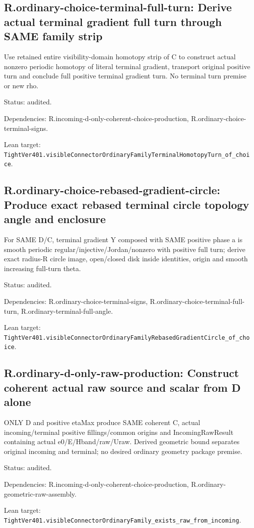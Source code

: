 \documentclass{article}
\begin{document}
\subsection*{R.ordinary-choice-terminal-full-turn: Derive actual terminal gradient full turn through SAME family strip}
Use retained entire visibility-domain homotopy strip of C to construct actual nonzero periodic homotopy of literal terminal gradient, transport original positive turn and conclude full positive terminal gradient turn. No terminal turn premise or new rho.
\par Status: audited.
\par Dependencies: R.incoming-d-only-coherent-choice-production, R.ordinary-choice-terminal-signs.
\par Lean target: \texttt{TightVer401.visibleConnectorOrdinaryFamilyTerminalHomotopyTurn\_of\_choice}.
\subsection*{R.ordinary-choice-rebased-gradient-circle: Produce exact rebased terminal circle topology angle and enclosure}
For SAME D/C, terminal gradient Y composed with SAME positive phase a is smooth periodic regular/injective/Jordan/nonzero with positive full turn; derive exact radius-R circle image, open/closed disk inside identities, origin and smooth increasing full-turn theta.
\par Status: audited.
\par Dependencies: R.ordinary-choice-terminal-signs, R.ordinary-choice-terminal-full-turn, R.ordinary-terminal-full-angle.
\par Lean target: \texttt{TightVer401.visibleConnectorOrdinaryFamilyRebasedGradientCircle\_of\_choice}.
\subsection*{R.ordinary-d-only-raw-production: Construct coherent actual raw source and scalar from D alone}
ONLY D and positive etaMax produce SAME coherent C, actual incoming/terminal positive fillings/common origins and IncomingRawResult containing actual e0/E/Hband/raw/Uraw. Derived geometric bound separates original incoming and terminal; no desired ordinary geometry package premise.
\par Status: audited.
\par Dependencies: R.incoming-d-only-coherent-choice-production, R.ordinary-geometric-raw-assembly.
\par Lean target: \texttt{TightVer401.visibleConnectorOrdinaryFamily\_exists\_raw\_from\_incoming}.
\end{document}
